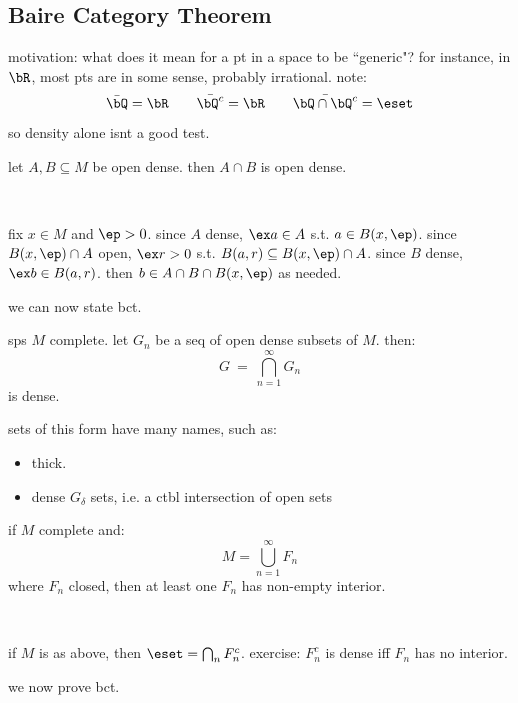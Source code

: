 \subsection{Baire Category Theorem}

motivation: what does it mean for a pt in a space to be ``generic"?
for instance, in $\bR$, most pts are in some sense, probably irrational.
note:
\begin{equation*}
	\bar{\bQ}=\bR \qquad \bar{\bQ^{c}}=\bR \qquad \bar{\bQ\cap\bQ^{c}}=\eset
\end{equation*}
so density alone isnt a good test.

\begin{lm}
	let $A,B\subseteq M$ be open dense. then $A\cap B$ is open dense.
\end{lm} \

\begin{pf}[source=Primary Source Material]
	fix $x\in M$ and $\ep>0$.
	since $A$ dense, $\ex a\in A$ s.t. $a\in B(x,\ep)$.
	since $B(x,\ep)\cap A$ open, $\ex r>0$ s.t. $B(a,r)\subseteq B(x,\ep)\cap A$.
	since $B$ dense, $\ex b\in B(a,r)$.
	then $b\in A\cap B\cap B(x,\ep)$ as needed.
\end{pf}
we can now state bct.

\begin{thm}[title=Baire Category Theorem]
	sps $M$ complete. let $G_{n}$ be a seq of open dense subsets of $M$. then:
	\begin{equation*}
		G \ = \ \bigcap_{n=1}^{\infty}G_{n}
	\end{equation*}
	is dense.
\end{thm}
sets of this form have many names, such as:
\begin{itemize}
	\item thick.
	\item dense $G_{\delta}$ sets, i.e. a ctbl intersection of open sets
\end{itemize}

\begin{crll}
	if $M$ complete and:
	\begin{equation*}
		M=\bigcup_{n=1}^{\infty}F_{n}
	\end{equation*}
	where $F_{n}$ closed, then at least one $F_{n}$ has non-empty interior.
\end{crll} \

\begin{pf}[source=Primary Source Material]
	if $M$ is as above, then $\eset=\bigcap_{n}F_{n}^{c}$.
	exercise: $F_{n}^{c}$ is dense iff $F_{n}$ has no interior.
\end{pf}
we now prove bct.

